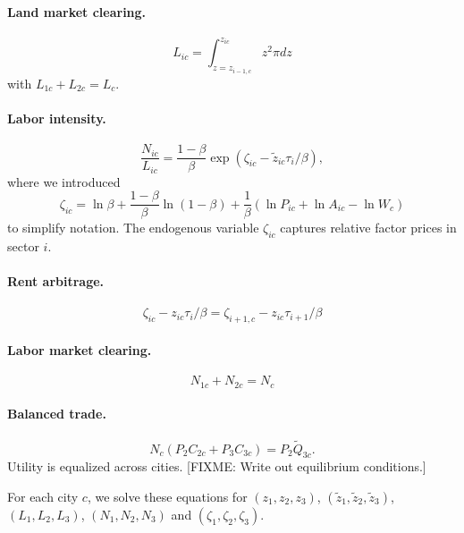 \documentclass[12pt]{article}
\begin{document}
\paragraph{Land market clearing.}
\begin{equation}\label{eq:land_market_clearing}
	L_{ic}
	=
	\int_{z=z_{i-1,c}}^{z_{ic}}
		z^2\pi
		dz
\end{equation}
with $L_{1c}+L_{2c}=L_c$.

\paragraph{Labor intensity.}
\begin{equation}\label{eq:labor_intensity}
	\frac 	{N_{ic}}
			{L_{ic}}
	=
	\frac 	{1-\beta}
			{\beta}
	\exp(\zeta_{ic}-\tilde z_{ic} \tau_i/\beta),
\end{equation}
where we introduced
\[
\zeta_{ic}=\ln\beta + \frac{1-\beta}{\beta} \ln (1-\beta)
+ \frac 1{\beta} (\ln P_{ic} + \ln A_{ic} - \ln W_c)
\]
to simplify notation. The endogenous variable $\zeta_{ic}$ captures relative factor prices in sector $i$.

\paragraph{Rent arbitrage.}
\begin{equation}\label{eq:rent_arbitrage}
	\zeta_{ic} - z_{ic} \tau_i/\beta
	=
	\zeta_{i+1,c} - z_{ic} \tau_{i+1}/\beta
\end{equation}
\paragraph{Labor market clearing.}
\begin{equation}\label{eq:labor_market_clearing}
	N_{1c}+N_{2c} = N_c
\end{equation}
\paragraph{Balanced trade.}
\begin{equation}\label{eq:balanced_trade}
N_c(P_2C_{2c} + P_3 C_{3c}) = P_2 \tilde Q_{3c}.
\end{equation}
 Utility is equalized across cities.
[FIXME: Write out equilibrium conditions.]

For each city $c$, we solve these equations for $(z_1,z_2,z_3)$, $(\tilde z_1,\tilde z_2,\tilde z_3)$, $(L_1,L_2,L_3)$, $(N_1,N_2,N_3)$ and $(\zeta_1,\zeta_2,\zeta_3)$.
\end{document}
